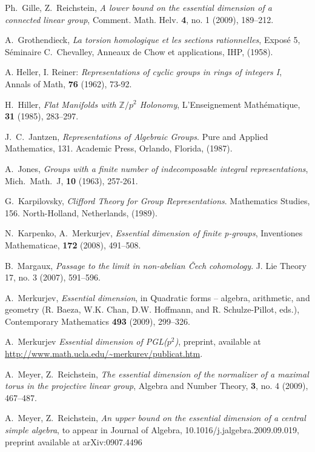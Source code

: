 \documentclass[11pt]{amsart}
\theoremstyle{definition}
\theoremstyle{remark}
\begin{document}
\begin{thebibliography}{99}
Ph.~Gille, Z.~Reichstein, {\em A lower bound on 
the essential dimension of a connected linear group},
Comment. Math. Helv.  {\bf 4},  no. 1 (2009), 189--212.

A.~Grothendieck,
{\em La torsion homologique et
les sections rationnelles}, Expos\'{e} 5, S\'eminaire C.~Chevalley,
Anneaux de Chow et applications, IHP, (1958).

A. Heller, I. Reiner: {\em Representations of cyclic groups
in rings of integers I},  Annals of Math, {\bf 76} (1962), 73-92.

H.~Hiller, {\em Flat Manifolds with ${\mathbb{Z}}/p^2$ Holonomy}, 
L'Enseignement Math\'{e}matique, {\bf 31} (1985), 283--297.

J.~C.~Jantzen, {\em Representations of Algebraic Groups}. Pure 
and Applied Mathematics, 131. Academic Press, Orlando, Florida, (1987).

A.~Jones, \textit{Groups with a finite number of indecomposable integral representations}, Mich.~Math.~J, {\bf 10} (1963), 257-261.

G.~Karpilovsky, {\em Clifford Theory for Group Representations}. Mathematics Studies, 156. North-Holland, Netherlands, (1989).

N.~Karpenko, A.~Merkurjev, {\em Essential dimension of finite p-groups},
Inventiones Mathematicae, {\bf 172} (2008), 491--508.

B.~Margaux, {\em Passage to the limit in non-abelian \v{C}ech cohomology}.
J. Lie Theory  17,  no. 3 (2007), 591--596.

A.~Merkurjev, {\em Essential dimension}, in
Quadratic forms -- algebra, arithmetic, and geometry (R. Baeza, W.K. Chan,
D.W. Hoffmann, and R. Schulze-Pillot, eds.), Contemporary Mathematics 
{\bf 493} (2009), 299--326.

A.~Merkurjev \textit{Essential dimension of PGL($p^2$)}, preprint,
available at \url{http://www.math.ucla.edu/~merkurev/publicat.htm}.

A.~Meyer, Z.~Reichstein,
{\em The essential dimension of the normalizer 
of a maximal torus in the projective linear group},
Algebra and Number Theory, {\bf 3}, no. 4 (2009),
467--487.

A.~Meyer,  Z.~Reichstein, {\em An upper bound on the essential 
dimension of a central simple algebra}, to appear in 
Journal of Algebra, 10.1016/j.jalgebra.2009.09.019, preprint
available at arXiv:0907.4496


\end{thebibliography}
\end{document}
